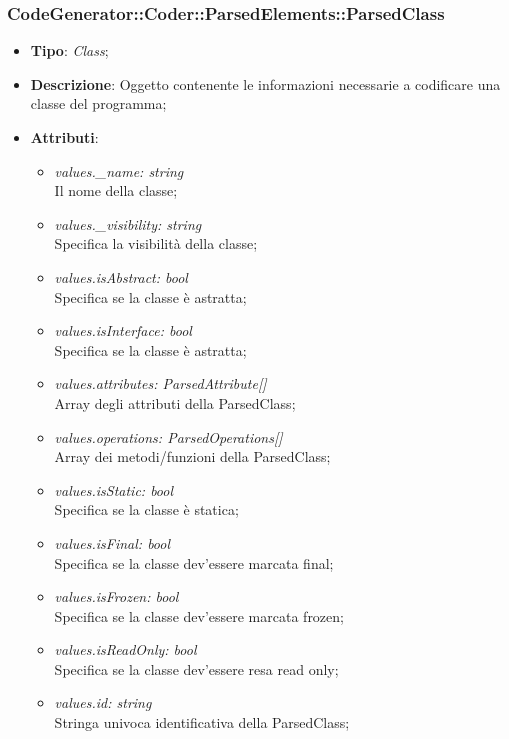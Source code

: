 \documentclass[../DefinizioneDiProdotto.tex]{subfiles}
\begin{document}
				\subsubsection{CodeGenerator::Coder::ParsedElements::ParsedClass}
			\hypertarget{SWEDesigner::Server::CodeGenerator::Coder::ParsedElements::ParsedClass}{}
			\begin{itemize}
				\item \textbf{Tipo}: \emph{Class};
				\item \textbf{Descrizione}: Oggetto contenente le informazioni necessarie a codificare una classe del programma;
				\item \textbf{Attributi}:
				\begin{itemize}
					\item \emph{values.\_name: string}\\
					Il nome della classe;
					\item \emph{values.\_visibility: string} \\
					Specifica la visibilità della classe;
					\item \emph{values.isAbstract: bool} \\
					Specifica se la classe è astratta;
					\item \emph{values.isInterface: bool} \\
					Specifica se la classe è astratta;
					\item \emph{values.attributes: ParsedAttribute[]} \\
					Array degli attributi della ParsedClass;
					\item \emph{values.operations: ParsedOperations[]} \\
					Array dei metodi/funzioni della ParsedClass;
					\item \emph{values.isStatic: bool} \\
					Specifica se la classe è statica;
					\item \emph{values.isFinal: bool} \\
					Specifica se la classe dev'essere marcata final;
					\item \emph{values.isFrozen: bool} \\
					Specifica se la classe dev'essere marcata frozen;
					\item \emph{values.isReadOnly: bool} \\
					Specifica se la classe dev'essere resa read only;
					\item \emph{values.id: string} \\
					Stringa univoca identificativa della ParsedClass;

\end{itemize}
\end{itemize}
\end{document}
